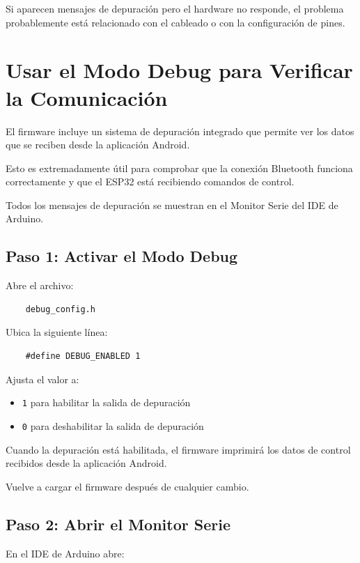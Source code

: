 Si aparecen mensajes de depuración pero el hardware no responde, el problema probablemente está relacionado con el cableado o con la configuración de pines.

\section{Usar el Modo Debug para Verificar la Comunicación}

El firmware incluye un sistema de depuración integrado que permite ver los datos que se reciben desde la aplicación Android.

Esto es extremadamente útil para comprobar que la conexión Bluetooth funciona correctamente y que el ESP32 está recibiendo comandos de control.

Todos los mensajes de depuración se muestran en el Monitor Serie del IDE de Arduino.

\subsection{Paso 1: Activar el Modo Debug}

Abre el archivo:

\begin{verbatim}
    debug_config.h
\end{verbatim}

Ubica la siguiente línea:

\begin{verbatim}
    #define DEBUG_ENABLED 1
\end{verbatim}

Ajusta el valor a:

\begin{itemize}
    \item \texttt{1} para habilitar la salida de depuración
    \item \texttt{0} para deshabilitar la salida de depuración
\end{itemize}

Cuando la depuración está habilitada, el firmware imprimirá los datos de control recibidos desde la aplicación Android.

Vuelve a cargar el firmware después de cualquier cambio.

\subsection{Paso 2: Abrir el Monitor Serie}

En el IDE de Arduino abre:

